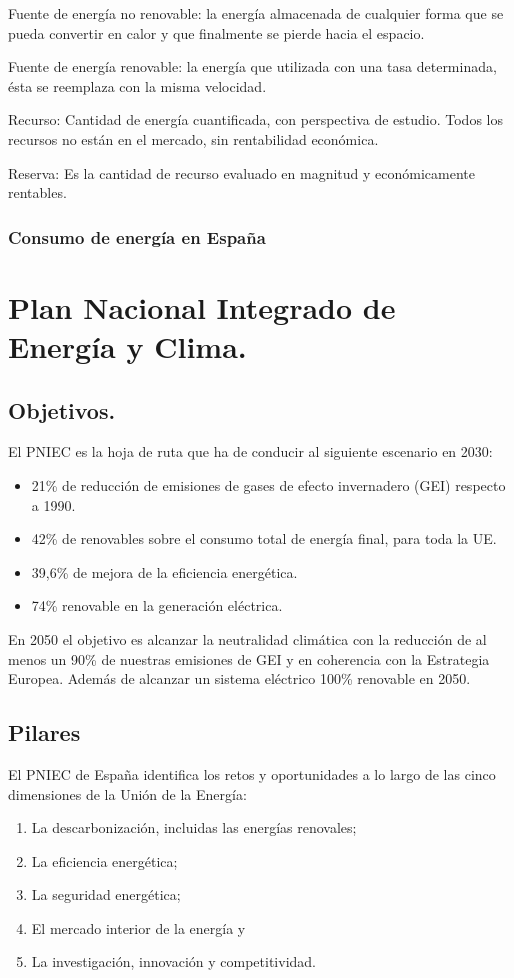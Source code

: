Fuente de energía no renovable: la energía almacenada de cualquier forma que se pueda convertir en calor y que finalmente se pierde hacia el espacio.

Fuente de energía renovable: la energía que utilizada con una tasa determinada, ésta se reemplaza con la misma velocidad.

Recurso: Cantidad de energía cuantificada, con perspectiva de estudio. Todos los recursos no están en el mercado, sin rentabilidad económica.

Reserva: Es la cantidad de recurso evaluado en magnitud y económicamente rentables.

\subsubsection{Consumo de energía en España}

\section{Plan Nacional Integrado de Energía y Clima.}
\subsection{Objetivos.}
El PNIEC es la hoja de ruta que ha de conducir al siguiente escenario en 2030:
\begin{itemize}
    \item 21\% de reducción de emisiones de gases de efecto invernadero (GEI) respecto a 1990.
    \item 42\% de renovables sobre el consumo total de energía final, para toda la UE.
    \item 39,6\% de mejora de la eficiencia energética.
    \item 74\% renovable en la generación eléctrica.
\end{itemize}
En 2050 el objetivo es alcanzar la neutralidad climática con la reducción de al menos un 90\% de nuestras emisiones de GEI y en coherencia con la Estrategia Europea. Además de alcanzar un sistema eléctrico 100\% renovable en 2050.

\subsection{Pilares}
El PNIEC de España identifica los retos y oportunidades a lo largo de las cinco dimensiones de la Unión de la Energía:
\begin{enumerate}
    \item La descarbonización, incluidas las energías renovales;
    \item La eficiencia energética;
    \item La seguridad energética;
    \item El mercado interior de la energía y
    \item La investigación, innovación y competitividad.
\end{enumerate}

